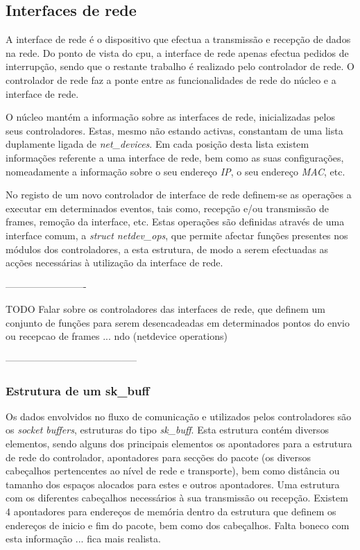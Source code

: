 \subsection{Interfaces de rede}

A interface de rede é o dispositivo que efectua a transmissão e recepção de dados na rede.
Do ponto de vista do cpu, a interface de rede apenas efectua pedidos de interrupção, sendo que o restante trabalho é realizado pelo controlador de rede.
O controlador de rede faz a ponte entre as funcionalidades de rede do núcleo e a interface de rede.

O núcleo mantém a informação sobre as interfaces de rede, inicializadas pelos seus controladores.
Estas, mesmo não estando activas, constantam de uma lista duplamente ligada de \textit{net\_devices}.
Em cada posição desta lista existem informações referente a uma interface de rede, bem como as suas configurações, nomeadamente a informação sobre o seu endereço \textit{IP}, o seu endereço \textit{MAC}, etc.

No registo de um novo controlador de interface de rede definem-se as operações a executar em determinados eventos, tais como, recepção e/ou transmissão de frames, remoção da interface, etc.
Estas operações são definidas através de uma interface comum, a \textit{struct netdev\_ops}, que permite afectar funções presentes nos módulos dos controladores, a esta estrutura, de modo a serem efectuadas as acções necessárias à utilização da interface de rede.

-------------------------

TODO
Falar sobre os controladores das interfaces de rede, que definem um conjunto de funções para serem desencadeadas em determinados pontos do envio ou recepcao de frames ... ndo (netdevice operations) 
 
-----------------------------------------

\subsubsection{Estrutura de um sk\_buff}
\label{subsub:sk_buff}

Os dados envolvidos no fluxo de comunicação e utilizados pelos controladores são os \textit{socket buffers}, estruturas do tipo \textit{sk\_buff}.
Esta estrutura contém diversos elementos, sendo alguns dos principais elementos os apontadores para a estrutura de rede do controlador, apontadores para secções do pacote (os diversos cabeçalhos pertencentes ao nível de rede e transporte), bem como distância ou tamanho dos espaços alocados para estes e outros apontadores.
Uma estrutura com os diferentes cabeçalhos necessários à sua transmissão ou recepção.
Existem 4 apontadores para endereços de memória dentro da estrutura que definem os endereços de inicio e fim do pacote, bem como dos cabeçalhos.
Falta boneco com esta informação ... fica mais realista.

